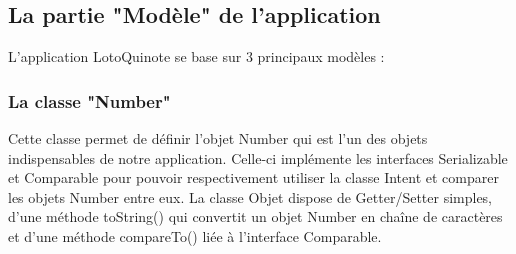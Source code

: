 \documentclass{article}
\begin{document}
\newpage
\subsection{La partie "Modèle" de l'application}
L'application LotoQuinote se base sur 3 principaux modèles :
\subsubsection{La classe "Number"}
Cette classe permet de définir l'objet Number qui est l'un des objets indispensables de notre application.
\newline Celle-ci implémente les interfaces Serializable\cite{serializable} et Comparable\cite{comparable} pour pouvoir respectivement utiliser la classe Intent et comparer les objets Number entre eux.
\newline La classe Objet dispose de Getter/Setter simples, d'une méthode toString() qui convertit un objet Number en chaîne de caractères et d'une méthode compareTo() liée à l'interface Comparable.
\end{document}
